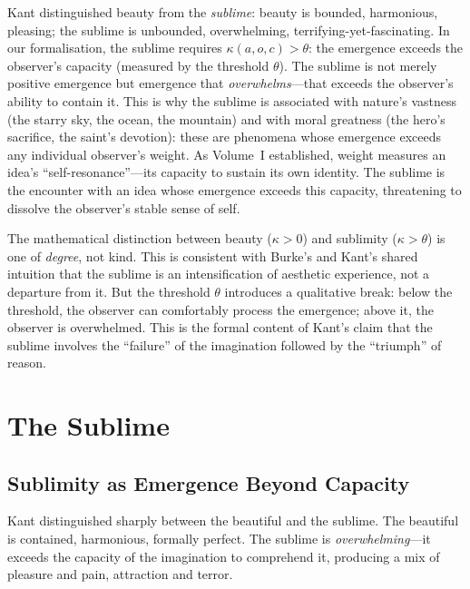 \begin{remark}
\label{rem:sublime-excess}
Kant distinguished beauty from the \emph{sublime}: beauty is bounded, harmonious, pleasing; the sublime is unbounded, overwhelming, terrifying-yet-fascinating.  In our formalisation, the sublime requires $\kappa(a, o, c) > \theta$: the emergence exceeds the observer's capacity (measured by the threshold $\theta$).  The sublime is not merely positive emergence but emergence that \emph{overwhelms}---that exceeds the observer's ability to contain it.  This is why the sublime is associated with nature's vastness (the starry sky, the ocean, the mountain) and with moral greatness (the hero's sacrifice, the saint's devotion): these are phenomena whose emergence exceeds any individual observer's weight.  As Volume~I established, weight measures an idea's ``self-resonance''---its capacity to sustain its own identity.  The sublime is the encounter with an idea whose emergence exceeds this capacity, threatening to dissolve the observer's stable sense of self.

The mathematical distinction between beauty ($\kappa > 0$) and sublimity ($\kappa > \theta$) is one of \emph{degree}, not kind.  This is consistent with Burke's and Kant's shared intuition that the sublime is an intensification of aesthetic experience, not a departure from it.  But the threshold $\theta$ introduces a qualitative break: below the threshold, the observer can comfortably process the emergence; above it, the observer is overwhelmed.  This is the formal content of Kant's claim that the sublime involves the ``failure'' of the imagination followed by the ``triumph'' of reason.
\end{remark}

\section{The Sublime}
\label{sec:kant:sublime}

\subsection{Sublimity as Emergence Beyond Capacity}

Kant distinguished sharply between the beautiful and the sublime.  The
beautiful is contained, harmonious, formally perfect.  The sublime is
\emph{overwhelming}---it exceeds the capacity of the imagination to
comprehend it, producing a mix of pleasure and pain, attraction and terror.

